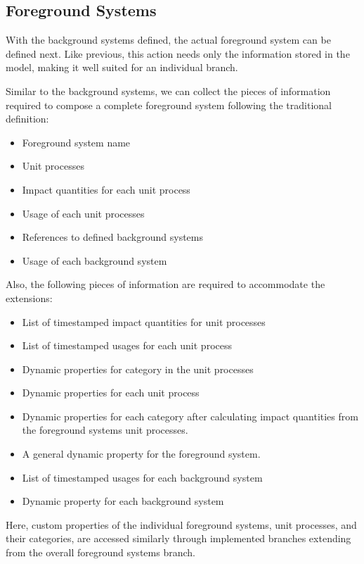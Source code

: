 \subsection{Foreground Systems} \label{ssec:Design-ForegroundSystems}
With the background systems defined, the actual foreground system can be defined next. Like previous, this action needs only the information stored in the model, making it well suited for an individual branch.

Similar to the background systems, we can collect the pieces of information required to compose a complete foreground system following the traditional definition:

\begin{itemize}
    \item Foreground system name
    \item Unit processes
    \item Impact quantities for each unit process
    \item Usage of each unit processes
    \item References to defined background systems
    \item Usage of each background system
\end{itemize}

Also, the following pieces of information are required to accommodate the extensions:

\begin{itemize}
    \item List of timestamped impact quantities for unit processes
    \item List of timestamped usages for each unit process
    \item Dynamic properties for category in the unit processes
    \item Dynamic properties for each unit process
    \item Dynamic properties for each category after calculating impact quantities from the foreground systems unit processes.
    \item A general dynamic property for the foreground system.
    \item List of timestamped usages for each background system
    \item Dynamic property for each background system
\end{itemize}

Here, custom properties of the individual foreground systems, unit processes, and their categories, are accessed similarly through implemented branches extending from the overall foreground systems branch.



